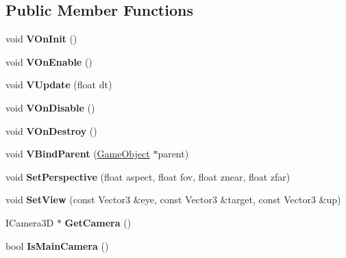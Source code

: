 \subsection*{Public Member Functions}
\begin{DoxyCompactItemize}
\item 
\hypertarget{class_vixen_1_1_camera_component_a8b35f82890f9936ac01079513fd71dfe}{}void {\bfseries V\+On\+Init} ()\label{class_vixen_1_1_camera_component_a8b35f82890f9936ac01079513fd71dfe}

\item 
\hypertarget{class_vixen_1_1_camera_component_a92a3af8eeafce284dd5244e566485594}{}void {\bfseries V\+On\+Enable} ()\label{class_vixen_1_1_camera_component_a92a3af8eeafce284dd5244e566485594}

\item 
\hypertarget{class_vixen_1_1_camera_component_a8a999b6875133ec8888193172c9068eb}{}void {\bfseries V\+Update} (float dt)\label{class_vixen_1_1_camera_component_a8a999b6875133ec8888193172c9068eb}

\item 
\hypertarget{class_vixen_1_1_camera_component_ac7f4a05b46f2419abac445ba006ee79e}{}void {\bfseries V\+On\+Disable} ()\label{class_vixen_1_1_camera_component_ac7f4a05b46f2419abac445ba006ee79e}

\item 
\hypertarget{class_vixen_1_1_camera_component_a4fc8cc22b0562c19c8185e9a941ead7e}{}void {\bfseries V\+On\+Destroy} ()\label{class_vixen_1_1_camera_component_a4fc8cc22b0562c19c8185e9a941ead7e}

\item 
\hypertarget{class_vixen_1_1_camera_component_a7b6d32109243cdb9d5494e7505d65613}{}void {\bfseries V\+Bind\+Parent} (\hyperlink{class_vixen_1_1_game_object}{Game\+Object} $\ast$parent)\label{class_vixen_1_1_camera_component_a7b6d32109243cdb9d5494e7505d65613}

\item 
\hypertarget{class_vixen_1_1_camera_component_a95aee990222572436420926b64e37318}{}void {\bfseries Set\+Perspective} (float aspect, float fov, float znear, float zfar)\label{class_vixen_1_1_camera_component_a95aee990222572436420926b64e37318}

\item 
\hypertarget{class_vixen_1_1_camera_component_a1f16fb590a56a926ac341c74a96b6eb9}{}void {\bfseries Set\+View} (const Vector3 \&eye, const Vector3 \&target, const Vector3 \&up)\label{class_vixen_1_1_camera_component_a1f16fb590a56a926ac341c74a96b6eb9}

\item 
\hypertarget{class_vixen_1_1_camera_component_a8f095544bfbbea8fbaa966b8bdea38ce}{}I\+Camera3\+D $\ast$ {\bfseries Get\+Camera} ()\label{class_vixen_1_1_camera_component_a8f095544bfbbea8fbaa966b8bdea38ce}

\item 
\hypertarget{class_vixen_1_1_camera_component_a5d5b451f1e7f49ba45499d5e027cfcda}{}bool {\bfseries Is\+Main\+Camera} ()\label{class_vixen_1_1_camera_component_a5d5b451f1e7f49ba45499d5e027cfcda}

\end{DoxyCompactItemize}


